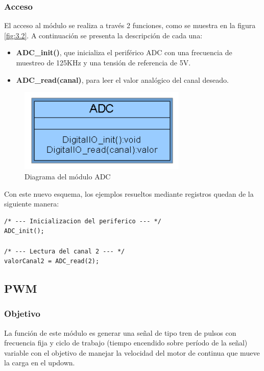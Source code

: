 \subsubsection{Acceso}

El acceso al módulo se realiza a través 2 funciones, como se muestra en la figura \ref{fig:3.2}. A continuación se presenta la descripción de cada una:
\begin{itemize}
	\item \textbf{ADC\_init()}, que inicializa el periférico ADC con una frecuencia de muestreo de 125KHz y una tensión de referencia de 5V.
	\item \textbf{ADC\_read(canal)}, para leer el valor analógico del canal deseado.
\end{itemize}

\begin{figure}[!ht]
	\centering
	\includegraphics[width=8cm,scale=1]{resources/3_2-moduloADC.png}
	\caption{Diagrama del módulo ADC}
	\label{fig:\thefigure}
\end{figure}

Con este nuevo esquema, los ejemplos resueltos mediante registros quedan de la siguiente manera:

\begin{lstlisting}[style=CStyle]
/* --- Inicializacion del periferico --- */
ADC_init(); 

/* --- Lectura del canal 2 --- */
valorCanal2 = ADC_read(2);
\end{lstlisting}



\subsection{PWM}
\subsubsection{Objetivo}
La función de este módulo es generar una señal de tipo tren de pulsos con frecuencia fija y ciclo de trabajo (tiempo encendido sobre período de la señal) variable con el objetivo de manejar la velocidad del motor de continua que mueve la carga en el updown.

